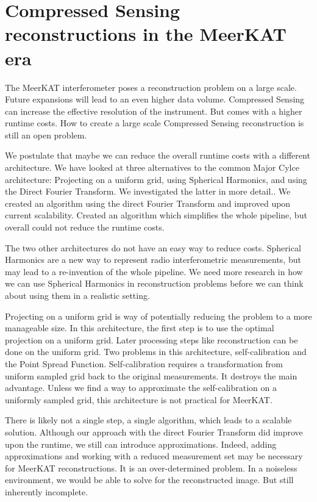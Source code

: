 \section{Compressed Sensing reconstructions in the MeerKAT era}
The MeerKAT interferometer poses a reconstruction problem on a large scale. Future expansions will lead to an even higher data volume. Compressed Sensing can increase the effective resolution of the instrument. But comes with a higher runtime costs. How to create a large scale Compressed Sensing reconstruction is still an open problem.

We postulate that maybe we can reduce the overall runtime costs with a different architecture. We have looked at three alternatives to the common Major Cylce architecture: Projecting on a uniform grid, using Spherical Harmonics, and using the Direct Fourier Transform. We investigated the latter in more detail.. We created an algorithm using the direct Fourier Transform and improved upon current scalability. Created an algorithm which simplifies the whole pipeline, but overall could not reduce the runtime costs.

The two other architectures do not have an easy way to reduce costs. Spherical Harmonics are a new way to represent radio interferometric measurements, but may lead to a re-invention of the whole pipeline. We need more research in how we can use Spherical Harmonics in reconstruction problems before we can think about using them in a realistic setting.

Projecting on a uniform grid is way of potentially reducing the problem to a more manageable size. In this architecture, the first step is to use the optimal projection on a uniform grid. Later processing steps like reconstruction can be done on the uniform grid. Two problems in this architecture, self-calibration and the Point Spread Function. Self-calibration requires a transformation from uniform sampled grid back to the original measurements. It destroys the main advantage. Unless we find a way to approximate the self-calibration on a uniformly sampled grid, this architecture is not practical for MeerKAT.

There is likely not a single step, a single algorithm, which leads to a scalable solution. Although our approach with the direct Fourier Transform did improve upon the runtime, we still can introduce approximations. Indeed, adding approximations and working with a reduced measurement set may be necessary for MeerKAT reconstructions. It is an over-determined problem. In a noiseless environment, we would be able to solve for the reconstructed image. But still inherently incomplete.





